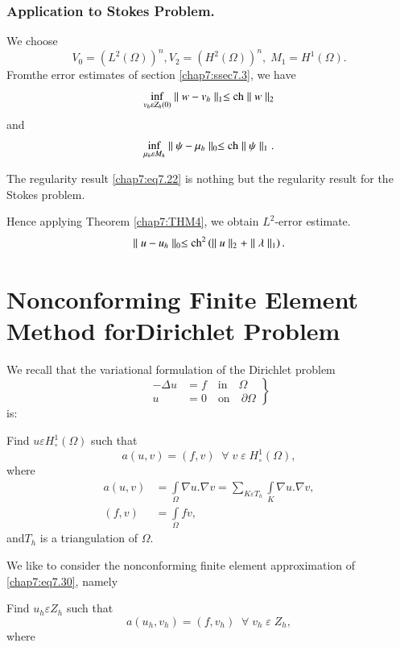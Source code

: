 \subsubsection{\bf Application to Stokes Problem.} We choose 
$$
V_0=(L^2(\Omega))^n,V_2=(H^2(\Omega))^n,\;M_1=H^1(\Omega).
$$
From\pageoriginale the error estimates of section \ref{chap7:ssec7.3},
we have 
$$
\inf\limits_{v_h\varepsilon Z_h(0)}\parallel w-v_h\parallel_1\leq
\operatorname{ch}\parallel w\parallel_2
$$
and 
$$
\inf\limits_{\mu_h\varepsilon M_h}\parallel\psi-\mu_h\parallel_0\leq
\operatorname{ch}\parallel\psi\parallel_1. 
$$

The regularity result \eqref{chap7:eq7.22} is nothing but the
regularity result for the Stokes problem.

Hence applying Theorem \ref{chap7:THM4}, we obtain $L^2$-error
estimate. 
$$
\parallel u-u_h\parallel_0\leq\operatorname{ch}^2\left(\parallel u\parallel_2+
\parallel\lambda\parallel_1\right).
$$

\section[Nonconforming Finite Element Method for...]{Nonconforming
  Finite Element Method for\hfil\break Dirichlet Problem} \label{chap7:ssec7.5}  
We recall that the variational formulation of the
Dirichlet problem 
\begin{equation}\label{chap7:eq7.29}
\left.
\begin{aligned}
-\Delta u &= f\quad\text{in}\quad\Omega\\
u &= 0\quad\text{on}\quad\partial\Omega
\end{aligned}
\right\}
\end{equation}
is:

Find $u\varepsilon H_\circ^1(\Omega)$ such that 
\begin{equation}\label{chap7:eq7.30}
a(u,v)=(f,v)\; \; \forall \;v\;\varepsilon \;H_\circ^1(\Omega),
\end{equation}
where 
\begin{align*}
a(u,v) &= \int\limits_\Omega\nabla u.\nabla v=
\sum\limits_{K\varepsilon T_h}\int\limits_K\nabla u.\nabla v,\\
(f,v) &= \int\limits_\Omega fv,
\end{align*}
and\pageoriginale $T_h$ is a triangulation of $\Omega$.

We like to consider the nonconforming finite element approximation of
\eqref{chap7:eq7.30}, namely 

Find $u_h\varepsilon Z_h$ such that 
\begin{equation}\label{chap7:eq7.31}
a(u_h,v_h)=(f,v_h)\; \; \forall \;v_h\;\varepsilon \;Z_h,
\end{equation}
where

